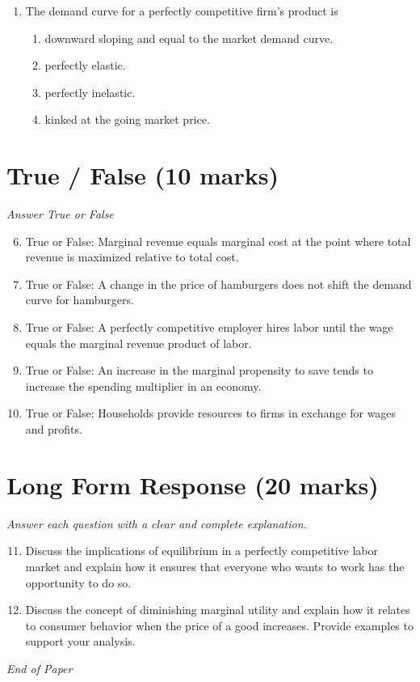 \documentclass[12pt]{article}
\begin{document}
\begin{enumerate}[label=\arabic*.]
\begin{enumerate}[label=(\alph*)]
    \item Lower taxes on research and development of new technology
    \item Higher taxes on household income
\end{enumerate}
\item The demand curve for a perfectly competitive firm's product is
\begin{enumerate}[label=(\alph*)]
    \item downward sloping and equal to the market demand curve.
    \item perfectly elastic.
    \item perfectly inelastic.
    \item kinked at the going market price.
\end{enumerate}
\end{enumerate}

\section*{True / False (10 marks)}
\textit{Answer True or False}
\begin{enumerate}[label=\arabic*.]
\setcounter{enumi}{5}
\item True or False: Marginal revenue equals marginal cost at the point where total revenue is maximized relative to total cost.
\item True or False: A change in the price of hamburgers does not shift the demand curve for hamburgers.
\item True or False: A perfectly competitive employer hires labor until the wage equals the marginal revenue product of labor.
\item True or False: An increase in the marginal propensity to save tends to increase the spending multiplier in an economy.
\item True or False: Households provide resources to firms in exchange for wages and profits.
\end{enumerate}

\section*{Long Form Response (20 marks)}
\textit{Answer each question with a clear and complete explanation.}
\begin{enumerate}[label=\arabic*.]
\setcounter{enumi}{10}
\item Discuss the implications of equilibrium in a perfectly competitive labor market and explain how it ensures that everyone who wants to work has the opportunity to do so.
\item Discuss the concept of diminishing marginal utility and explain how it relates to consumer behavior when the price of a good increases. Provide examples to support your analysis.
\end{enumerate}

\vfill
\noindent\textit{End of Paper}
\end{document}
